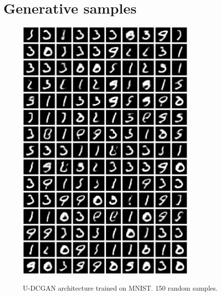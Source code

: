 \documentclass{article}
\theoremstyle{plain}
\theoremstyle{definition}
\theoremstyle{remark}
\begin{document}
\section{Generative samples}
\label{app:gen-samples}
\begin{figure}[htbp]
    \centering
    \includegraphics[width=0.8\textwidth]{./resources/modified_0-1_0-1_rand_samples.png}
    \label{fig:big-gen-mnist}
    \caption{U-DCGAN architecture trained on MNIST. 150 random samples.}
\end{figure}
\end{document}
